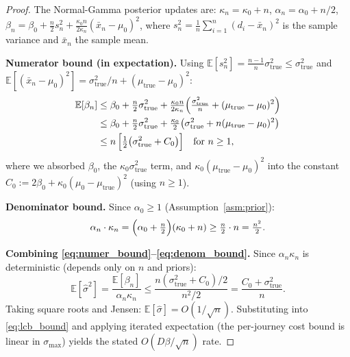 \documentclass[11pt]{article}
\theoremstyle{definition}
\theoremstyle{remark}
\begin{document}
\begin{proof}
The Normal-Gamma posterior updates are:
$\kappa_n = \kappa_0 + n$,\;
$\alpha_n = \alpha_0 + n/2$,\;
$\beta_n = \beta_0 + \tfrac{n}{2}s_n^2 + \tfrac{\kappa_0 n}{2\kappa_n}(\bar{x}_n - \mu_0)^2$,
where $s_n^2 = \tfrac{1}{n}\sum_{i=1}^n(d_i-\bar{x}_n)^2$ is the sample
variance and $\bar{x}_n$ the sample mean.

\noindent\textbf{Numerator bound (in expectation).}
Using $\mathbb{E}[s_n^2] = \tfrac{n-1}{n}\sigma_{\mathrm{true}}^2 \leq \sigma_{\mathrm{true}}^2$
and $\mathbb{E}[(\bar{x}_n - \mu_0)^2] = \sigma_{\mathrm{true}}^2/n + (\mu_{\mathrm{true}}-\mu_0)^2$:
\begin{align}
\mathbb{E}[\beta_n]
&\leq \beta_0 + \tfrac{n}{2}\sigma_{\mathrm{true}}^2
  + \tfrac{\kappa_0 n}{2\kappa_n}\!\left(\tfrac{\sigma_{\mathrm{true}}^2}{n} + (\mu_{\mathrm{true}}-\mu_0)^2\right)
  \notag\\
&\leq \beta_0 + \tfrac{n}{2}\sigma_{\mathrm{true}}^2
  + \tfrac{\kappa_0}{2}\!\left(\sigma_{\mathrm{true}}^2 + n(\mu_{\mathrm{true}}-\mu_0)^2\right)
  \notag\\
&\leq n\,\Bigl[\tfrac{1}{2}\bigl(\sigma_{\mathrm{true}}^2 + C_0\bigr)\Bigr]
  \quad\text{for } n\geq 1,
\label{eq:numer_bound}
\end{align}
where we absorbed $\beta_0$, the $\kappa_0\sigma_{\mathrm{true}}^2$ term,
and $\kappa_0(\mu_{\mathrm{true}}-\mu_0)^2$ into the constant
$C_0 := 2\beta_0 + \kappa_0(\mu_0-\mu_{\mathrm{true}})^2$ (using $n\geq 1$).

\noindent\textbf{Denominator bound.}
Since $\alpha_0 \geq 1$ (Assumption~\ref{asm:prior}):
\begin{equation}
\alpha_n \cdot \kappa_n
= \Bigl(\alpha_0 + \tfrac{n}{2}\Bigr)(\kappa_0 + n)
\geq \tfrac{n}{2} \cdot n
= \tfrac{n^2}{2}.
\label{eq:denom_bound}
\end{equation}

\noindent\textbf{Combining \eqref{eq:numer_bound}--\eqref{eq:denom_bound}.}
Since $\alpha_n\kappa_n$ is deterministic (depends only on $n$ and priors):
\[
\mathbb{E}[\hat\sigma^2] = \frac{\mathbb{E}[\beta_n]}{\alpha_n\kappa_n}
\leq \frac{n(\sigma_{\mathrm{true}}^2 + C_0)/2}{n^2/2}
= \frac{C_0 + \sigma_{\mathrm{true}}^2}{n}.
\]
Taking square roots and Jensen: $\mathbb{E}[\hat\sigma] = O(1/\sqrt{n})$.
Substituting into \eqref{eq:lcb_bound} and applying iterated expectation
(the per-journey cost bound is linear in $\sigma_{\max}$) yields the
stated $O(D\beta/\sqrt{n})$ rate.
\end{proof}
\end{document}
